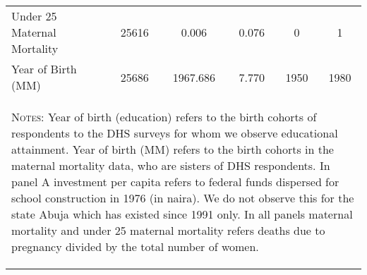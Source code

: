 \begin{table}[htpb!]
\begin{center}
\begin{tabular}{l c c c c c}
Under 25 Maternal Mortality	&	25616	&	0.006	&	0.076	&	0	&	1	\\
Year of Birth (MM)	&	25686	&	1967.686	&	7.770	&	1950	&	1980	\\
\midrule											
\multicolumn{6}{p{12cm}}{\begin{footnotesize}\textsc{Notes:}  Year of birth (education) refers to the birth cohorts of respondents to the DHS surveys for whom we observe educational attainment.  Year of birth (MM) refers to the birth cohorts in the maternal mortality data, who are sisters of DHS respondents.  In panel A investment per capita refers to federal funds dispersed for school construction in 1976 (in naira).  We do not observe this for the state Abuja which has existed since 1991 only.  In all panels maternal mortality and under 25 maternal mortality refers deaths due to pregnancy divided by the total number of women. \end{footnotesize}} \\											
\bottomrule											
\end{tabular}											
\end{center}											
\end{table}											

